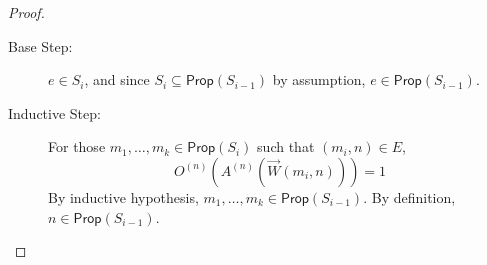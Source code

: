 \documentclass[letterpaper]{article}
\theoremstyle{definition}
\newcommand{\Prop}{\textsf{Prop}}
\begin{document}
\begin{proof}
\begin{description}
    \begin{description}
    \item[Base Step:] $e \in S_i$, and since $S_i \subseteq \Prop(S_{i-1})$ by assumption, $e \in \Prop(S_{i-1})$.
    
    \item[Inductive Step:] For those $m_1, \ldots, m_k \in \Prop(S_i)$ such that $(m_i, n) \in E$,
    \[
    O^{(n)}(A^{(n)}(\overrightarrow{W}(m_i, n))) = 1
    \]
    By inductive hypothesis, $m_1, \ldots, m_k \in \Prop(S_{i-1})$.  By definition, $n \in \Prop(S_{i-1})$.
    
    \end{description}
    
\end{description}
\end{proof}
\end{document}
